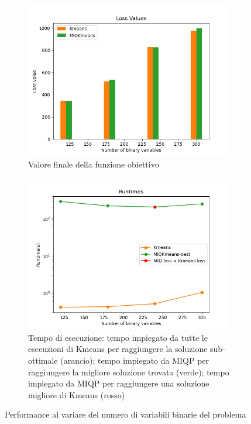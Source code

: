 \documentclass{article}
\begin{document}
    \begin{figure}[h]
        \centering
        \begin{subfigure}[t]{0.49\linewidth}
            \centering
            \includegraphics[width=\linewidth]{../results/log_plots/loss_multiple_inits_heart}
            \caption{Valore finale della funzione obiettivo}
        \end{subfigure}
        \hfill
        \begin{subfigure}[t]{0.49\linewidth}
            \centering
            \includegraphics[width=\linewidth]{../results/log_plots/runtime_multiple_inits_heart_log}
            \caption{Tempo di esecuzione: tempo impiegato da tutte le esecuzioni di Kmeans per raggiungere la soluzione sub-ottimale (arancio); tempo impiegato da MIQP per raggiungere la migliore soluzione trovata (verde); tempo impiegato da MIQP per raggiungere una soluzione migliore di Kmeans (rosso)}
        \end{subfigure}
            \caption{Performance al variare del numero di variabili binarie del problema}
            \label{fig:multi_init}
    \end{figure}
\end{document}
